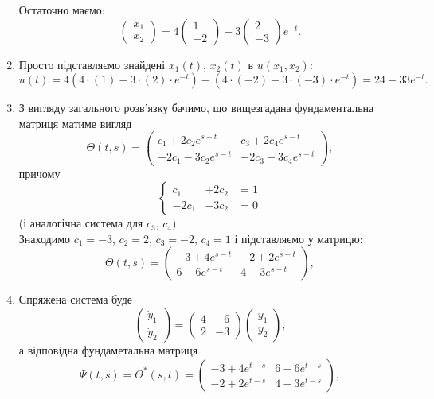 \begin{solution}
\begin{enumerate}
		Остаточно маємо:
		\[
			\begin{pmatrix}
				x_1 \\
				x_2
			\end{pmatrix}
			=
			4
			\begin{pmatrix}
				1 \\
				-2
			\end{pmatrix} 
			-3
			\begin{pmatrix}
				2 \\
				-3
			\end{pmatrix}
			e^{-t}
			.
		\]
		\item Просто підставляємо знайдені $x_1(t)$, $x_2(t)$ в $u(x_1, x_2)$:
		\[
			u(t)
			=
			4\left(4\cdot (1) - 3\cdot (2)\cdot e^{-t}\right)
			-
			\left(4\cdot (-2) - 3\cdot (-3)\cdot e^{-t}\right)
			=
			24 - 33e^{-t}.
		\]
		\item З вигляду загального розв'язку бачимо, що вищезгадана фундаментальна матриця матиме вигляд
		\[
			\Theta(t,s)
			=
			\begin{pmatrix}
				c_1 + 2c_2 e^{s-t} & c_3 + 2c_4 e^{s-t} \\
				-2c_1 - 3c_2 e^{s-t} & -2c_3 - 3c_4 e^{s-t} 
			\end{pmatrix},
		\]
		причому 
		\[
			\left\{
				\begin{aligned}
					c_1   &+ 2c_2 &= 1 \\
					-2c_1 &- 3c_2 &= 0
				\end{aligned}
			\right.		
		\]
		(і аналогічна система для $c_3$, $c_4$).\\
		
		Знаходимо $c_1 = -3$, $c_2 = 2$, $c_3 = -2$, $c_4 = 1$ і підставляємо у матрицю:
		\[
			\Theta(t,s)
			=
			\begin{pmatrix}
				-3 + 4e^{s-t} & -2 + 2e^{s-t} \\
				6 - 6e^{s-t} & 4 - 3e^{s-t} 
			\end{pmatrix},
		\]
		
		\item Спряжена система буде
		\[
			\begin{pmatrix}
				\dot y_1 \\
				\dot y_2
			\end{pmatrix}
			=
			\begin{pmatrix}
				4 & -6 \\
				2 & -3
			\end{pmatrix}
			\begin{pmatrix}
				y_1 \\
				y_2
			\end{pmatrix},
		\]
		а відповідна фундаметальна матриця
		\[
			\Psi(t,s)
			=
			\Theta^*(s,t)
			=
			\begin{pmatrix}
				-3 + 4e^{t-s} & 6 - 6e^{t-s} \\
				-2 + 2e^{t-s} & 4 - 3 e^{t-s}
			\end{pmatrix},
		\]
	\end{enumerate}
\end{solution}


